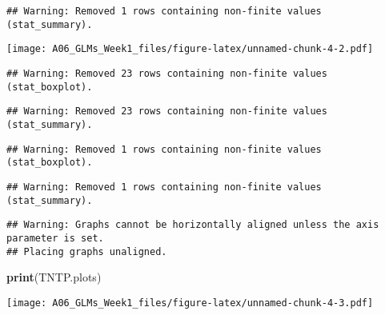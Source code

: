 \documentclass[]{article}
\newenvironment{Shaded}{\begin{snugshade}}{\end{snugshade}}
\newcommand{\KeywordTok}[1]{\textcolor[rgb]{0.13,0.29,0.53}{\textbf{#1}}}
\newcommand{\DataTypeTok}[1]{\textcolor[rgb]{0.13,0.29,0.53}{#1}}
\newcommand{\DecValTok}[1]{\textcolor[rgb]{0.00,0.00,0.81}{#1}}
\newcommand{\StringTok}[1]{\textcolor[rgb]{0.31,0.60,0.02}{#1}}
\newcommand{\CommentTok}[1]{\textcolor[rgb]{0.56,0.35,0.01}{\textit{#1}}}
\newcommand{\NormalTok}[1]{#1}
\begin{document}
\begin{verbatim}
## Warning: Removed 1 rows containing non-finite values (stat_summary).
\end{verbatim}

\texttt{[image: A06\_GLMs\_Week1\_files/figure-latex/unnamed-chunk-4-2.pdf]}

\begin{Shaded}
\end{Shaded}

\begin{verbatim}
## Warning: Removed 23 rows containing non-finite values (stat_boxplot).
\end{verbatim}

\begin{verbatim}
## Warning: Removed 23 rows containing non-finite values (stat_summary).
\end{verbatim}

\begin{verbatim}
## Warning: Removed 1 rows containing non-finite values (stat_boxplot).
\end{verbatim}

\begin{verbatim}
## Warning: Removed 1 rows containing non-finite values (stat_summary).
\end{verbatim}

\begin{verbatim}
## Warning: Graphs cannot be horizontally aligned unless the axis parameter is set.
## Placing graphs unaligned.
\end{verbatim}

\begin{Shaded}
\begin{Highlighting}[]
\KeywordTok{print}\NormalTok{(TNTP.plots)}
\end{Highlighting}
\end{Shaded}

\texttt{[image: A06\_GLMs\_Week1\_files/figure-latex/unnamed-chunk-4-3.pdf]}
\end{document}
